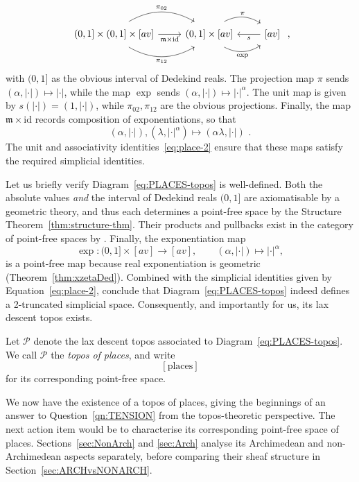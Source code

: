\documentclass[a4paper, 11pt,reqno]{amsart}
\newcommand{\calP}{\mathcal{P}}
\newcommand{\id}{\mathrm{id}}
\newcommand{\m}{\mathfrak{m}}
\begin{document}
\begin{equation}\label{eq:PLACES-topos}
\begin{tikzcd} (0,1] \times (0,1]\times [av] \ar[r, bend right, shift right=1ex, swap, "\pi_{12}"] \ar[r,swap,"\m\times\id"] \ar[r,bend left, shift left=1ex,  "\pi_{02}"]& (0,1]\times  {{[av]}}  \ar[r, bend right,shift right=1ex, swap, "\exp"] \ar[r, bend left, shift left=1ex, "\pi"] & {{[av]}} \ar[l, "s"] \end{tikzcd} \,\,, %
\end{equation}
with $(0,1]$ as the obvious interval of Dedekind reals. The projection map $\pi$ sends $(\alpha,|\cdot|)\mapsto |\cdot|$, while the map $\exp$ sends $(\alpha,|\cdot|)\mapsto|\cdot|^\alpha$. The unit map is given by $s(|\cdot|)=(1,|\cdot|)$, while $\pi_{02},\pi_{12}$ are the obvious projections. Finally, the map $\m\times\id$ records composition of exponentiations, so that
$$
(\alpha,|\cdot|),(\lambda,|\cdot|^\alpha)
\longmapsto
(\alpha\lambda,|\cdot|)\,\,.
$$
The unit and associativity identities~\eqref{eq:place-2} ensure that these maps satisfy the required simplicial identities.
\smallskip

Let us briefly verify Diagram~\eqref{eq:PLACES-topos} is well-defined. Both the absolute values {\em and} the interval of Dedekind reals $(0,1]$ are axiomatisable by a geometric theory, and thus each determines a point-free space by the Structure Theorem~\ref{thm:structure-thm}. Their products and pullbacks exist in the category of point-free spaces by \cite[Theorem B4.1.1]{Elephant}. Finally, the exponentiation map 
$$\exp\colon(0,1]\times[av]\longrightarrow[av],
\qquad
(\alpha,|\cdot|)\longmapsto|\cdot|^\alpha,$$
is a point-free map because real exponentiation is geometric (Theorem~\ref{thm:xzetaDed}). Combined with the simplicial identities given by Equation~\eqref{eq:place-2}, conclude that Diagram~\eqref{eq:PLACES-topos} indeed defines a 2-truncated simplicial space. Consequently, and importantly for us, its lax descent topos exists. 

\begin{definition}\label{def:places} Let $\calP$ denote the lax descent topos associated to Diagram~\eqref{eq:PLACES-topos}. We call $\calP$ the {\em topos of places}, and write 
	$$[\mathrm{places}]$$
for its corresponding point-free space. 
\end{definition}

We now have the existence of a topos of places, giving the beginnings of an answer to Question~\ref{qn:TENSION} from the topos-theoretic perspective. The next action item would be to characterise its corresponding point-free space of places. Sections~\ref{sec:NonArch} and \ref{sec:Arch} analyse its Archimedean and non-Archimedean aspects separately, before comparing their sheaf structure in Section~\ref{sec:ARCHvsNONARCH}.
\end{document}
